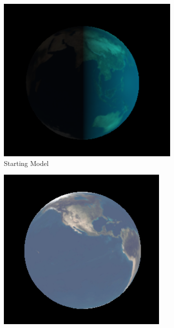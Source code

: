 \documentclass[12pt]{article}
\begin{document}
\begin{figure}[!h]
\centering
    \begin{subfigure}{.5\textwidth}
        \centering
        \includegraphics[width = \textwidth]{figs/ex_35_normal.png}
        \caption{Starting Model}
        \label{fig:ex_35_normal}
    \end{subfigure}%
    \begin{subfigure}{.5\textwidth}
        \centering
        \includegraphics[width = \textwidth]{figs/ex_35_material.png}

\end{subfigure}
\end{figure}
\end{document}
